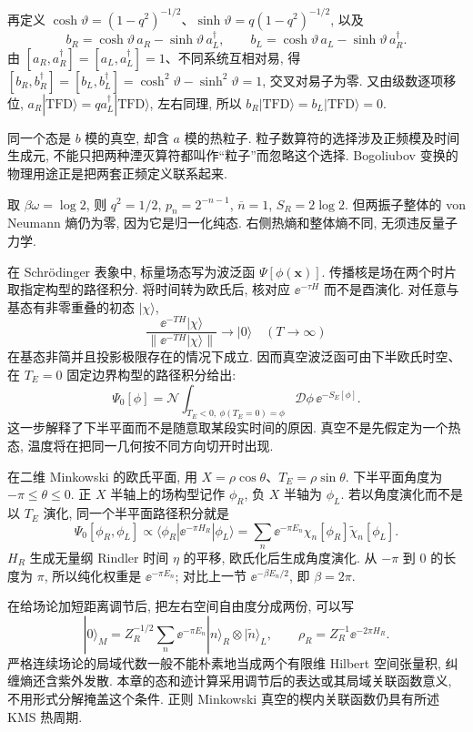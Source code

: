再定义 $\cosh\vartheta=(1-q^2)^{-1/2}$、$\sinh\vartheta=q(1-q^2)^{-1/2}$, 以及
\[
b_R=\cosh\vartheta\,a_R-\sinh\vartheta\,a_L^\dagger,
\qquad b_L=\cosh\vartheta\,a_L-\sinh\vartheta\,a_R^\dagger.
\]
由 $[a_R,a_R^\dagger]=[a_L,a_L^\dagger]=1$、不同系统互相对易, 得 $[b_R,b_R^\dagger]=[b_L,b_L^\dagger]=\cosh^2\vartheta-\sinh^2\vartheta=1$, 交叉对易子为零. 又由级数逐项移位, $a_R|\mathrm{TFD}\rangle=q a_L^\dagger|\mathrm{TFD}\rangle$, 左右同理, 所以 $b_R|\mathrm{TFD}\rangle=b_L|\mathrm{TFD}\rangle=0$.

同一个态是 $b$ 模的真空, 却含 $a$ 模的热粒子. 粒子数算符的选择涉及正频模及时间生成元, 不能只把两种湮灭算符都叫作“粒子”而忽略这个选择. Bogoliubov 变换的物理用途正是把两套正频定义联系起来.

\begin{example}
取 $\beta\omega=\log2$, 则 $q^2=1/2$, $p_n=2^{-n-1}$, $\overline n=1$, $S_R=2\log2$. 但两振子整体的 von Neumann 熵仍为零, 因为它是归一化纯态. 右侧热熵和整体熵不同, 无须违反量子力学.
\end{example}

在 Schrödinger 表象中, 标量场态写为波泛函 $\Psi[\phi(\mathbf x)]$. 传播核是场在两个时片取指定构型的路径积分. 将时间转为欧氏后, 核对应 $\ee^{-\tau H}$ 而不是酉演化. 对任意与基态有非零重叠的初态 $|\chi\rangle$,
\[
\frac{\ee^{-TH}|\chi\rangle}{\|\ee^{-TH}|\chi\rangle\|}
\longrightarrow |0\rangle\quad(T\to\infty)
\]
在基态非简并且投影极限存在的情况下成立. 因而真空波泛函可由下半欧氏时空、在 $T_E=0$ 固定边界构型的路径积分给出:
\[
\Psi_0[\phi]=\mathcal N
\int_{T_E<0,\ \phi(T_E=0)=\phi}\mathcal D\phi\,
\ee^{-S_E[\phi]}.
\]
这一步解释了下半平面而不是随意取某段实时间的原因. 真空不是先假定为一个热态, 温度将在把同一几何按不同方向切开时出现.

在二维 Minkowski 的欧氏平面, 用 $X=\rho\cos\theta$、$T_E=\rho\sin\theta$. 下半平面角度为 $-\pi\le\theta\le0$. 正 $X$ 半轴上的场构型记作 $\phi_R$, 负 $X$ 半轴为 $\phi_L$. 若以角度演化而不是以 $T_E$ 演化, 同一个半平面路径积分就是
\[
\Psi_0[\phi_R,\phi_L]
\propto\langle\phi_R|\ee^{-\pi H_R}|\phi_L\rangle
=\sum_n\ee^{-\pi E_n}
\chi_n[\phi_R]\widetilde\chi_n[\phi_L].
\]
$H_R$ 生成无量纲 Rindler 时间 $\eta$ 的平移, 欧氏化后生成角度演化. 从 $-\pi$ 到 0 的长度为 $\pi$, 所以纯化权重是 $\ee^{-\pi E_n}$; 对比上一节 $\ee^{-\beta E_n/2}$, 即 $\beta=2\pi$.

在给场论加短距离调节后, 把左右空间自由度分成两份, 可以写
\[
|0\rangle_M=Z_R^{-1/2}\sum_n\ee^{-\pi E_n}
|n\rangle_R\otimes|\widetilde n\rangle_L,
\qquad \rho_R=Z_R^{-1}\ee^{-2\pi H_R}.
\]
严格连续场论的局域代数一般不能朴素地当成两个有限维 Hilbert 空间张量积, 纠缠熵还含紫外发散. 本章的态和迹计算采用调节后的表达或其局域关联函数意义, 不用形式分解掩盖这个条件. 正则 Minkowski 真空的楔内关联函数仍具有所述 KMS 热周期.

